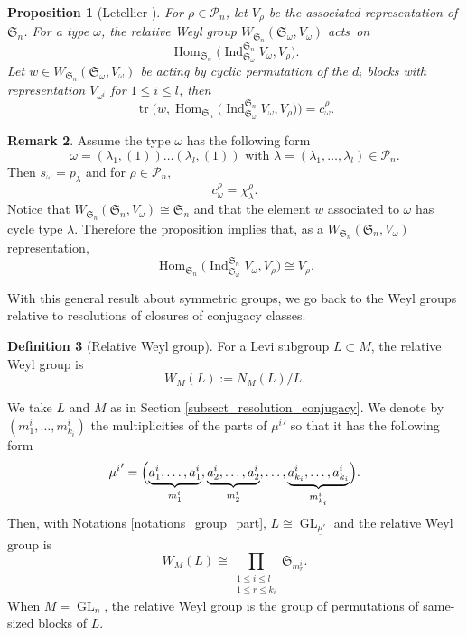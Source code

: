 \documentclass[JEP,XML,SOM,NoEqCountersInSection,Unicode,published]{cedram}
\theoremstyle{definition}
\newtheorem{definition}{Definition}[section]
\newtheorem{remark}[definition]{Remark}
\theoremstyle{plain}
\newtheorem{proposition}[definition]{Proposition}
\DeclareMathOperator{\Hom}{Hom}
\DeclareMathOperator{\Ind}{Ind}
\DeclareMathOperator{\tr}{tr}
\DeclareMathOperator{\GL}{GL}
\newcommand{\Sym}{\mathfrak{S}}
\newcommand{\Part}{\mathcal{P}}
\begin{document}
\begin{proposition}[Letellier {\cite[Prop.\,6.2.5]{Letellier_gl}}]\label{proposition_tr_relative_sym}
For $\rho\in \Part_n$, let $V_{\rho}$ be the asso\-ciated representation of $\Sym_n$. For a type $\omega$, the relative Weyl group $W_{\Sym_n}(\Sym_{\omega},V_{\omega})$ acts~on
\[
\Hom_{\Sym_n} \bigl(\Ind_{\Sym_{\omega}}^{\Sym_n} V_{\omega}, V_{\rho}\bigr).
\]
Let $w\in W_{\Sym_n} \left(\Sym_{\omega},V_{\omega}\right) $ be acting by cyclic permutation of the $d_i$ blocks with representation $V_{\omega^i}$ for $1\le i \le l$, then
\[
\tr \bigl(w, \Hom_{\Sym_n} \bigl(\Ind_{\Sym_{\omega}}^{\Sym_n} V_{\omega}, V_{\rho}\bigr)\bigr) = c_{\omega}^{\rho}.
\]
\end{proposition}
\begin{remark}
Assume the type $\omega$ has the following form
\[
\omega=(\lambda_1, (1))\dots (\lambda_l, (1)) \text{ with } \lambda=(\lambda_1,\dots,\lambda_l)\in\Part_n.
\]
Then $s_{\omega}=p_{\lambda}$ and for $\rho\in\Part_n$,
\[
c^{\rho}_{\omega}= \chi^{\rho}_{\lambda}.
\]
Notice that $W_{\Sym_n}\left(\Sym_n, V_{\omega}\right)\cong \Sym_n$ and that the element $w$ associated to $\omega$ has cycle type $\lambda$. Therefore the proposition implies that, as a $W_{\Sym_n}\left(\Sym_n, V_{\omega}\right)$ representation,
\[
\Hom_{\Sym_n} \bigl(\Ind_{\Sym_{\omega}}^{\Sym_n} V_{\omega}, V_{\rho}\bigr)\cong V_{\rho}.
\]
\end{remark}

With this general result about symmetric groups, we go back to the Weyl groups relative to resolutions of closures of conjugacy classes.

\begin{definition}[Relative Weyl group]
For a Levi subgroup $L\subset M$, the relative Weyl group is
\[
W_{M}(L) := N_{M} (L)/L.
\]
\end{definition}

We take $L$ and $M$ as in Section \ref{subsect_resolution_conjugacy}. We denote by $(m^{i}_1,\dots,m^{i}_{k_{i}})$ the multiplicities of the parts of ${\mu^{i}}'$ so that it has the following form
\[
{\mu^{i}}'=\Bigl(\underbrace{a^{i}_1,\dots,a^{i}_1}_{m^{i}_1},\underbrace{a^{i}_2,\dots,a^{i}_2}_{m^{i}_2},\dots, \underbrace{a^{i}_{k_i},\dots,a^{i}_{k_i}}_{m^{i}_{k_i}}\Bigr).
\]
Then, with Notations \ref{notations_group_part}, $L\cong \GL_{\underline{\mu}'}$ and the relative Weyl group is
\[
W_{M}(L) \cong \prod_{\substack{ 1 \le i \le l \\ 1 \le r \le k_{i}}} \Sym_{m^{i}_{r}}.
\]
When $M=\GL_n$, the relative Weyl group is the group of permutations of same-sized blocks of $L$.
\end{document}
